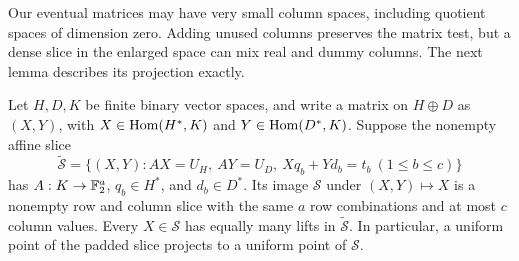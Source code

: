 Our eventual matrices may have very small column spaces, including
quotient spaces of dimension zero.  Adding unused columns preserves
the matrix test, but a dense slice in the enlarged space can mix real
and dummy columns.  The next lemma describes its projection exactly.

\begin{lemma}
\label{lem:padding}
Let $H,D,K$ be finite binary vector spaces, and write a matrix on
$H\oplus D$ as $(X,Y)$, with $X\in\operatorname{Hom}(H^*,K)$ and
$Y\in\operatorname{Hom}(D^*,K)$.  Suppose the nonempty affine slice
\begin{equation}
 \widetilde{\mathcal S}=
 \{(X,Y):AX=U_H,\ AY=U_D,\
       Xq_b+Yd_b=t_b\ (1\leq b\leq c)\}
 \label{eq:prelim-padded-slice}
\end{equation}
has $A:K\to\mathbb F_2^a$, $q_b\in H^*$, and $d_b\in D^*$.
Its image $\mathcal S$ under $(X,Y)\mapsto X$ is a nonempty row
and column slice with the same $a$ row combinations and at most $c$
column values.  Every $X\in\mathcal S$ has equally many lifts in
$\widetilde{\mathcal S}$.  In particular, a uniform point of the
padded slice projects to a uniform point of $\mathcal S$.
\end{lemma}

